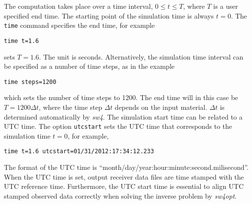 \documentclass[11pt]{report}
\begin{document}
The computation takes place over a time interval, $0\leq t \leq T$, where $T$ is a user specified end time.
The starting point of the simulation time is always $t=0$. The {\tt time} command specifies the end time, for example
\begin{verbatim}
time t=1.6
\end{verbatim}
sets $T=1.6$. The unit is seconds. Alternatively, the simulation time interval can be specified as 
a number of time steps, as in the example
\begin{verbatim}
time steps=1200
\end{verbatim}
which sets the number of time steps to 1200. The end time will in this case be $T=1200\Delta t$, where the
time step $\Delta t$ depends on the input material. $\Delta t$ is determined automatically by \emph{sw4}.
The simulation start time can be related to a UTC time. The option {\tt utcstart} sets the UTC time that
corresponds to the simulation time $t=0$, for example,
\begin{verbatim}
time t=1.6 utcstart=01/31/2012:17:34:12.233
\end{verbatim}
The format of the UTC time is ``month/day/year:hour:minute:second.milisecond''. When the UTC time is set,
output receiver data files are time stamped with the UTC reference time. Furthermore, the UTC start time
is essential to align UTC stamped observed data correctly when solving the inverse problem by \emph{sw4opt}.
\end{document}
